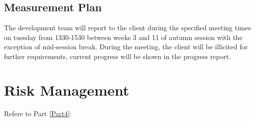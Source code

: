 \subsection{Measurement Plan}

The development team will report to the client during the specified meeting times on tuesday from 1330-1530 between weeks 3 and 11 of autumn session with the exception of mid-session break. During the meeting, the client will be illicited for further requirements, current progress will be shown in the progress report.


\section{Risk Management}

	Refere to Part \ref{Part4}:
